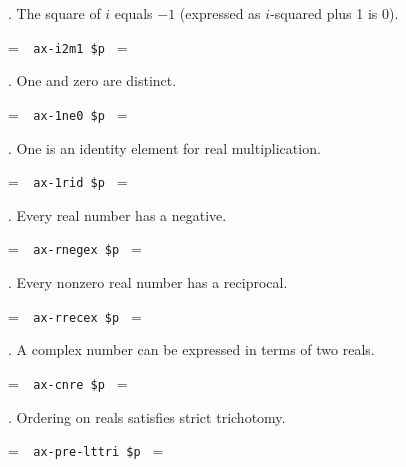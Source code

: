 . The square of $i$ equals $-1$ (expressed as $i$-squared plus 1 is
0).

\setbox\startprefix=\hbox{\tt \ \ ax-i2m1\ \$p\ }
\setbox\contprefix=\hbox{\tt \ \ \ \ \ \ \ \ \ \ \ \ }
\startm
\m{\vdash}\m{(}\m{(}\m{\cdot}\m{)}\m{+}\m{)}\m{=}
\endm

. One and zero are distinct.

\setbox\startprefix=\hbox{\tt \ \ ax-1ne0\ \$p\ }
\setbox\contprefix=\hbox{\tt \ \ \ \ \ \ \ \ \ \ \ \ }
\startm
\m{\vdash}\m{\ne}
\endm

. One is an identity element for real multiplication.

\setbox\startprefix=\hbox{\tt \ \ ax-1rid\ \$p\ }
\setbox\contprefix=\hbox{\tt \ \ \ \ \ \ \ \ \ \ \ }
\startm
\m{\vdash}\m{(}\m{\in}\m{\rightarrow}\m{(}\m{\cdot}%
\m{)}\m{=}\m{)}
\endm

. Every real number has a negative.

\setbox\startprefix=\hbox{\tt \ \ ax-rnegex\ \$p\ }
\setbox\contprefix=\hbox{\tt \ \ \ \ \ \ \ \ \ \ \ \ \ \ }
\startm
\m{\vdash}\m{(}\m{\in}\m{\rightarrow}\m{\exists}\m{\in}%
\m{(}\m{+}\m{)}\m{=}\m{)}
\endm

. Every nonzero real number has a reciprocal.

\setbox\startprefix=\hbox{\tt \ \ ax-rrecex\ \$p\ }
\setbox\contprefix=\hbox{\tt \ \ \ \ \ \ \ \ \ \ \ \ \ \ }
\startm
\m{\vdash}\m{(}\m{\in}\m{\rightarrow}\m{(}\m{\ne}%
\m{\rightarrow}\m{\exists}\m{\in}\m{(}\m{\cdot}%
\m{)}\m{=}\m{)}\m{)}
\endm

. A complex number can be expressed in terms of two reals.

\setbox\startprefix=\hbox{\tt \ \ ax-cnre\ \$p\ }
\setbox\contprefix=\hbox{\tt \ \ \ \ \ \ \ \ \ \ \ \ }
\startm
\m{\vdash}\m{(}\m{\in}\m{\rightarrow}\m{\exists}\m{\in}%
\m{\exists}\m{\in}\m{=}\m{(}\m{+}\m{(}%
\m{\cdot}\m{)}\m{)}\m{)}
\endm

. Ordering on reals satisfies strict trichotomy.

\setbox\startprefix=\hbox{\tt \ \ ax-pre-lttri\ \$p\ }
\setbox\contprefix=\hbox{\tt \ \ \ \ \ \ \ \ \ \ \ \ \ }
\startm
\m{\vdash}\m{(}\m{(}\m{\in}\m{\wedge}\m{\in}%
\m{)}\m{\rightarrow}\m{(}\m{<}\m{\leftrightarrow}\m{\lnot}\m{(}%
\m{=}\m{\vee}\m{<}\m{)}\m{)}\m{)}
\endm

